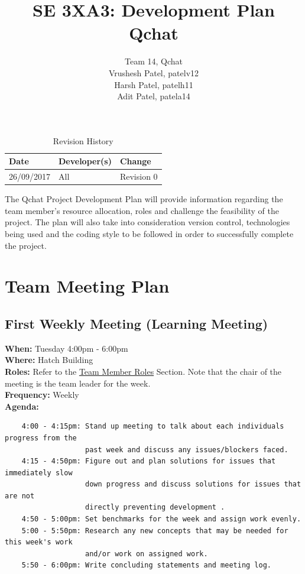 \documentclass{article}
\title{SE 3XA3: Development Plan\\Qchat}
\author{Team 14, Qchat
		\\ Vrushesh Patel, patelv12
		\\ Harsh Patel, patelh11
		\\ Adit Patel, patela14
}
\date{}
\begin{document}
\maketitle

\newpage

\tableofcontents

\begin{table}[hp]
\caption{Revision History} \label{TblRevisionHistory}
\begin{tabularx}{\textwidth}{llX}
\toprule
\textbf{Date} & \textbf{Developer(s)} & \textbf{Change}\\
\midrule
26/09/2017 & All & Revision 0\\
\bottomrule
\end{tabularx}
\end{table}

\newpage 

The Qchat Project Development Plan will provide information regarding the team member's resource allocation, roles and challenge the feasibility of the project. The plan will also take into consideration version control, technologies being used and the coding style to be followed in order to successfully complete the project. 

\section{Team Meeting Plan}
\subsection{First Weekly Meeting (Learning Meeting)}
\textbf{When:} Tuesday 4:00pm - 6:00pm\\
\textbf{Where:} Hatch Building \\
\textbf{Roles:} Refer to the \hyperref[TeamMemberRoles]{Team Member Roles} Section. Note that the chair of the meeting is the team leader for the week. \\ 
\textbf{Frequency:} Weekly\\
\textbf{Agenda:} 
\begin{verbatim}
    4:00 - 4:15pm: Stand up meeting to talk about each individuals progress from the
                   past week and discuss any issues/blockers faced. 
    4:15 - 4:50pm: Figure out and plan solutions for issues that immediately slow  
                   down progress and discuss solutions for issues that are not 
                   directly preventing development . 
    4:50 - 5:00pm: Set benchmarks for the week and assign work evenly. 
    5:00 - 5:50pm: Research any new concepts that may be needed for this week's work
                   and/or work on assigned work. 
    5:50 - 6:00pm: Write concluding statements and meeting log.
\end{verbatim}
\end{document}
